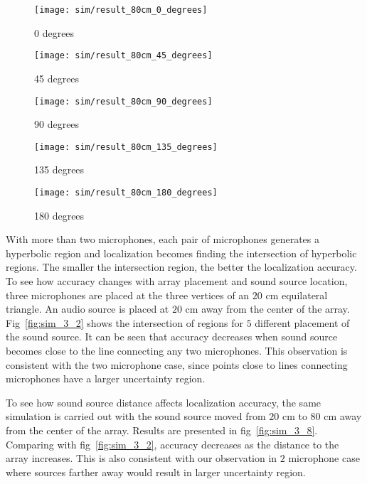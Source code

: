 \begin{figure*}[]
  \centering
  \begin{subfigure}[]{.3\textwidth}
    \texttt{[image: sim/result\_80cm\_0\_degrees]}
    \caption{0 degrees}
  \end{subfigure}
  \begin{subfigure}[]{.3\textwidth}
    \texttt{[image: sim/result\_80cm\_45\_degrees]}
    \caption{45 degrees}
  \end{subfigure}
  \begin{subfigure}[]{.3\textwidth}
    \texttt{[image: sim/result\_80cm\_90\_degrees]}
    \caption{90 degrees}
  \end{subfigure}
  \begin{subfigure}[]{.3\textwidth}
    \texttt{[image: sim/result\_80cm\_135\_degrees]}
    \caption{135 degrees}
  \end{subfigure}
  \begin{subfigure}[]{.3\textwidth}
    \texttt{[image: sim/result\_80cm\_180\_degrees]}
    \caption{180 degrees}
  \end{subfigure}
  \caption{$20$ cm equilateral triangle array. Source is $80$ cm away from the array}
  \label{fig:sim_3_8}
\end{figure*}

With more than two microphones, each pair of microphones generates a hyperbolic region and localization becomes finding the intersection of hyperbolic regions. The smaller the intersection region, the better the localization accuracy. To see how accuracy changes with array placement and sound source location, three microphones are placed at the three vertices of an $20$ cm equilateral triangle. An audio source is placed at $20$ cm away from the center of the array. Fig~\ref{fig:sim_3_2} shows the intersection of regions for $5$ different placement of the sound source. It can be seen that accuracy decreases when sound source becomes close to the line connecting any two microphones. This observation is consistent with the two microphone case, since points close to lines connecting microphones have a larger uncertainty region.

To see how sound source distance affects localization accuracy, the same simulation is carried out with the sound source moved from $20$ cm to $80$ cm away from the center of the array. Results are presented in fig~\ref{fig:sim_3_8}. Comparing with fig~\ref{fig:sim_3_2}, accuracy decreases as the distance to the array increases. This is also consistent with our observation in $2$ microphone case where sources farther away would result in larger uncertainty region.

